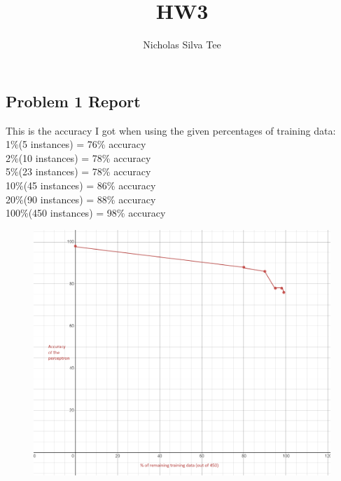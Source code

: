 \documentclass[letter]{article}
\title{HW3}
\author{Nicholas Silva Tee}
\theoremstyle{case}
\begin{document}
\subsection*{Problem 1 Report}
This is the accuracy I got when using the given percentages of training data: \\
1\%(5 instances) = 76\% accuracy\\
2\%(10 instances) = 78\% accuracy\\
5\%(23 instances) = 78\% accuracy\\
10\%(45 instances) = 86\% accuracy\\
20\%(90 instances) = 88\% accuracy\\
100\%(450 instances) = 98\% accuracy\\
\begin{figure}[h!]
	\includegraphics[scale=0.4]{accPlot.png}
\end{figure} 
\newpage
\end{document}
